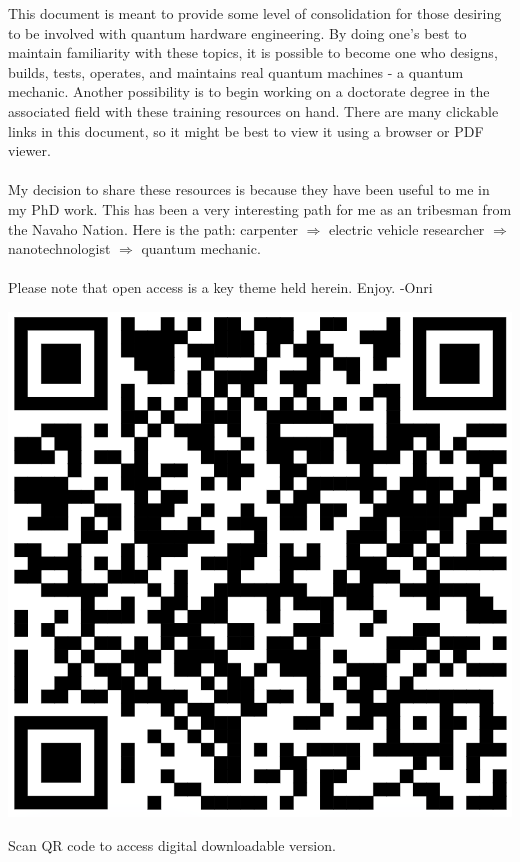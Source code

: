 \large{This document is meant to provide some level of consolidation for those desiring to be involved with quantum hardware engineering. By doing one's best to maintain familiarity with these topics, it is possible to become one who designs, builds, tests, operates, and maintains real quantum machines - a quantum mechanic. Another possibility is to begin working on a doctorate degree in the associated field with these training resources on hand. There are many clickable links in this document, so it might be best to view it using a browser or PDF viewer. 
\\ 
\space
\\
\indent My decision to share these resources is because they have been useful to me in my PhD work. This has been a very interesting path for me as an tribesman from the Navaho Nation. Here is the path: carpenter $\Longrightarrow$ electric vehicle researcher $\Longrightarrow$ nanotechnologist $\Longrightarrow$ quantum mechanic.
\\ 
\space
\\
\indent Please note that open access is a key theme held herein. Enjoy. -Onri
}
\\
\begin{center}

\includegraphics[scale=0.75]{qrcode_www.overleaf.com.png}

Scan QR code to access digital downloadable version.

\end{center}

